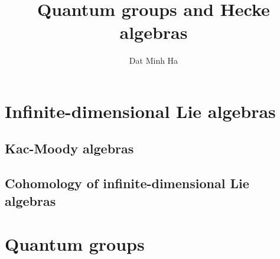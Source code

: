 

\setcounter{chapter}{-1}
\setcounter{section}{-1}





    \title{Quantum groups and Hecke algebras}
    
    \author{Dat Minh Ha}
    \maketitle
    
    \begin{abstract}
        
    \end{abstract}
    
    {
      \hypersetup{} 
      \dominitoc
      \tableofcontents %
      \listoftodos
    }
    
    

    \part{Infinite-dimensional Lie algebras}
        \chapter{Kac-Moody algebras}
            \begin{abstract}
            
            \end{abstract}
            
            \minitoc

            

            

        \chapter{Cohomology of infinite-dimensional Lie algebras}
            \begin{abstract}
            
            \end{abstract}
            
            \minitoc
    
    \part{Quantum groups}
